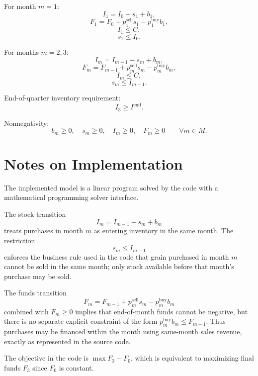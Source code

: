 For month \(m=1\):
\[
I_1 = I_0 - s_1 + b_1,
\]
\[
F_1 = F_0 + p^{\text{sell}}_1 s_1 - p^{\text{buy}}_1 b_1,
\]
\[
I_1 \le C,
\]
\[
s_1 \le I_0.
\]

For months \(m=2,3\):
\[
I_m = I_{m-1} - s_m + b_m,
\]
\[
F_m = F_{m-1} + p^{\text{sell}}_m s_m - p^{\text{buy}}_m b_m,
\]
\[
I_m \le C,
\]
\[
s_m \le I_{m-1}.
\]

End-of-quarter inventory requirement:
\[
I_3 \ge I^{\text{end}}.
\]

Nonnegativity:
\[
b_m \ge 0,\quad s_m \ge 0,\quad I_m \ge 0,\quad F_m \ge 0
\qquad \forall m \in M.
\]

\section*{Notes on Implementation}

The implemented model is a linear program solved by the code with a mathematical programming solver interface.

The stock transition
\[
I_m = I_{m-1} - s_m + b_m
\]
treats purchases in month \(m\) as entering inventory in the same month. The restriction
\[
s_m \le I_{m-1}
\]
enforces the business rule used in the code that grain purchased in month \(m\) cannot be sold in the same month; only stock available before that month's purchase may be sold.

The funds transition
\[
F_m = F_{m-1} + p^{\text{sell}}_m s_m - p^{\text{buy}}_m b_m
\]
combined with \(F_m \ge 0\) implies that end-of-month funds cannot be negative, but there is no separate explicit constraint of the form \(p^{\text{buy}}_m b_m \le F_{m-1}\). Thus purchases may be financed within the month using same-month sales revenue, exactly as represented in the source code.

The objective in the code is \(\max F_3 - F_0\), which is equivalent to maximizing final funds \(F_3\) since \(F_0\) is constant.
